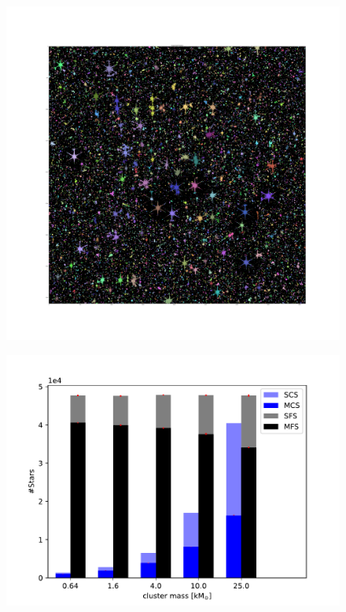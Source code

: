 \documentclass{beamer}
\begin{document}
\begin{frame}
\begin{figure}
\centering
\includegraphics[width=\textwidth,height=\textheight,keepaspectratio]{Images/ISPhotutils_32BK_4THRE_3Kernel.png}
\end{figure}
\end{frame}

\begin{frame}
\begin{figure}
\centering
\includegraphics[width=\textwidth,height=\textheight,keepaspectratio]{Images/25_n_stars.pdf}
\end{figure}
\end{frame}
\end{document}

